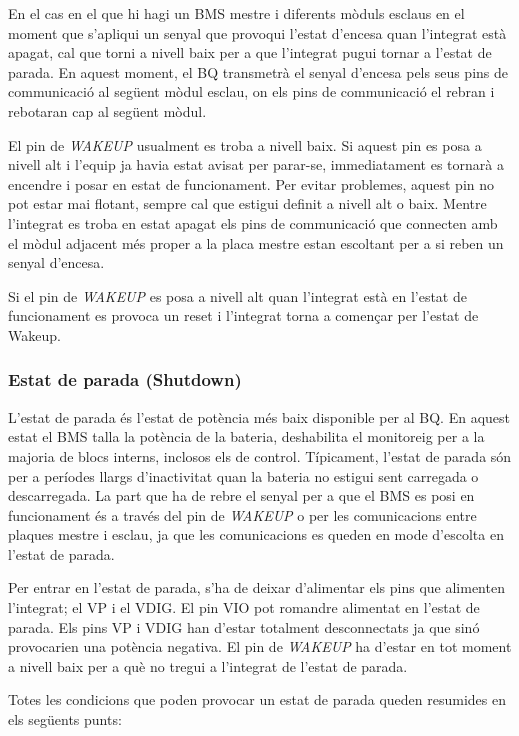 En el cas en el que hi hagi un BMS mestre i diferents mòduls esclaus en el moment que s'apliqui un senyal que provoqui l'estat d'encesa quan l'integrat està apagat, cal que torni a nivell baix per a que l'integrat pugui tornar a l'estat de parada. En aquest moment, el BQ transmetrà el senyal d'encesa pels seus pins de communicació al següent mòdul esclau, on els pins de communicació el rebran i rebotaran cap al següent mòdul.

El pin de \textit{WAKEUP} usualment es troba a nivell baix. Si aquest pin es posa a nivell alt i l'equip ja havia estat avisat per parar-se, immediatament es tornarà a encendre i posar en estat de funcionament. Per evitar problemes, aquest pin no pot estar mai flotant, sempre cal que estigui definit a nivell alt o baix. Mentre l'integrat es troba en estat apagat els pins de communicació que connecten amb el mòdul adjacent més proper a la placa mestre estan escoltant per a si reben un senyal d'encesa. 

Si el pin de \textit{WAKEUP} es posa a nivell alt quan l'integrat està en l'estat de funcionament es provoca un reset i l'integrat torna a començar per l'estat de Wakeup.

\subsubsection{Estat de parada (Shutdown)}

L'estat de parada és l'estat de potència més baix disponible per al BQ. En aquest estat el BMS talla la potència de la bateria, deshabilita el monitoreig per a la majoria de blocs interns, inclosos els de control. Típicament, l'estat de parada són per a períodes llargs d'inactivitat quan la bateria no estigui sent carregada o descarregada. La part que ha de rebre el senyal per a que el BMS es posi en funcionament és a través del pin de \textit{WAKEUP} o per les comunicacions entre plaques mestre i esclau, ja que les comunicacions es queden en mode d'escolta en l'estat de parada. 

Per entrar en l'estat de parada, s'ha de deixar d'alimentar els pins que alimenten l'integrat; el VP i el VDIG. El pin VIO pot romandre alimentat en l'estat de parada. Els pins VP i VDIG han d'estar totalment desconnectats ja que sinó provocarien una potència negativa. El pin de \textit{WAKEUP} ha d'estar en tot moment a nivell baix per a què no tregui a l'integrat de l'estat de parada. 

Totes les condicions que poden provocar un estat de parada queden resumides en els següents punts:

